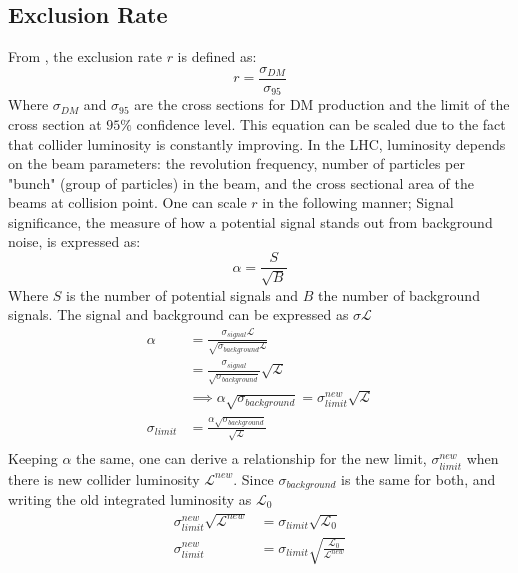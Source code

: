 \documentclass[12pt]{article}
\begin{document}
\subsection{Exclusion Rate}
From \cite{Aruhrib2012Inert}, the exclusion rate $r$ is defined as:
\begin{equation}
    r = \frac{\sigma_{DM}}{\sigma_{95}}
\end{equation}
Where $\sigma_{DM}$ and $\sigma_{95}$ are the cross sections for DM production and the limit of the cross section at $95\%$ confidence level. This equation can be scaled due to the fact that collider luminosity is constantly improving. In the LHC, luminosity depends on the beam parameters: the revolution frequency, number of particles per "bunch" (group of particles) in the beam, and the cross sectional area of the beams at collision point. One can scale $r$ in the following manner;
Signal significance, the measure of how a potential signal stands out from background noise, is expressed as:
\begin{equation}
    \alpha = \frac{S}{\sqrt{B}}
\end{equation}
Where $S$ is the number of potential signals and $B$ the number of background signals. The signal and background can be expressed as $\sigma \mathcal{L}$
\begin{equation}
    \begin{split}
        \alpha &= \frac{\sigma_{signal} \mathcal{L}}{\sqrt{\sigma_{background }\mathcal{L}}}
        \\&= \frac{\sigma_{signal}}{\sqrt{\sigma_{background}}} \sqrt{\mathcal{L}}
        \\&\implies \alpha \sqrt{\sigma_{background}} = \sigma_{limit}^{new}\sqrt{\mathcal{L}}
        \\\sigma_{limit} &=\frac{\alpha \sqrt{\sigma_{background}}}{\sqrt{\mathcal{L}}}  
        \\
    \end{split}
\end{equation}
Keeping $\alpha$ the same, one can derive a relationship for the new limit, $\sigma_{limit}^{new}$ when there is new collider luminosity $\mathcal{L}^{new}$. Since $\sigma_{background}$ is the same for both, and writing the old integrated luminosity as $\mathcal{L}_0$ 
\begin{equation}
    \begin{split}
    \sigma_{limit}^{new} \sqrt{\mathcal{L}^{new}} &= \sigma_{limit}\sqrt{\mathcal{L}_0}
        \\ \sigma_{limit}^{new}&= \sigma_{limit}\sqrt{\frac{\mathcal{L}_0}{\mathcal{L}^{new}}}
    \end{split}
\end{equation}
\end{document}

